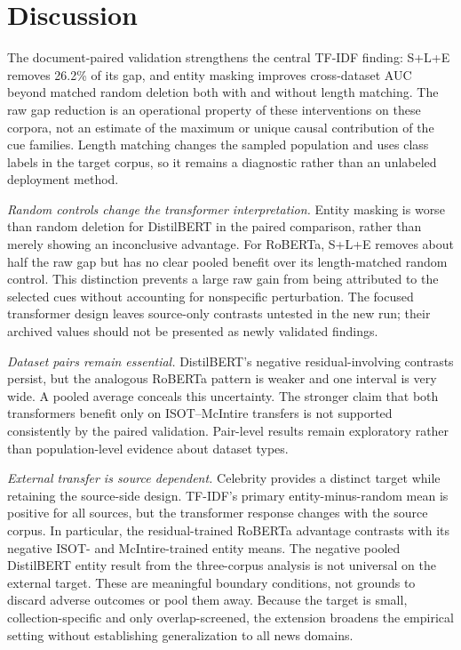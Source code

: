 \section{Discussion}
The document-paired validation strengthens the central TF-IDF finding: S+L+E removes 26.2\% of its gap, and entity masking improves cross-dataset AUC beyond matched random deletion both with and without length matching. The raw gap reduction is an operational property of these interventions on these corpora, not an estimate of the maximum or unique causal contribution of the cue families. Length matching changes the sampled population and uses class labels in the target corpus, so it remains a diagnostic rather than an unlabeled deployment method.

\emph{Random controls change the transformer interpretation.} Entity masking is worse than random deletion for DistilBERT in the paired comparison, rather than merely showing an inconclusive advantage. For RoBERTa, S+L+E removes about half the raw gap but has no clear pooled benefit over its length-matched random control. This distinction prevents a large raw gain from being attributed to the selected cues without accounting for nonspecific perturbation. The focused transformer design leaves source-only contrasts untested in the new run; their archived values should not be presented as newly validated findings.

\emph{Dataset pairs remain essential.} DistilBERT's negative residual-involving contrasts persist, but the analogous RoBERTa pattern is weaker and one interval is very wide. A pooled average conceals this uncertainty. The stronger claim that both transformers benefit only on ISOT--McIntire transfers is not supported consistently by the paired validation. Pair-level results remain exploratory rather than population-level evidence about dataset types.

\emph{External transfer is source dependent.} Celebrity provides a distinct target while retaining the source-side design. TF-IDF's primary entity-minus-random mean is positive for all sources, but the transformer response changes with the source corpus. In particular, the residual-trained RoBERTa advantage contrasts with its negative ISOT- and McIntire-trained entity means. The negative pooled DistilBERT entity result from the three-corpus analysis is not universal on the external target. These are meaningful boundary conditions, not grounds to discard adverse outcomes or pool them away. Because the target is small, collection-specific and only overlap-screened, the extension broadens the empirical setting without establishing generalization to all news domains.

